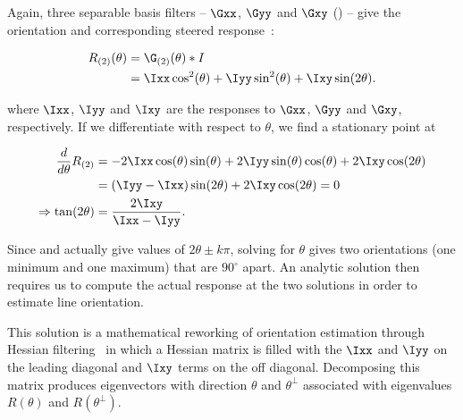 Again, three separable basis filters -- $\Gxx$, $\Gyy$ and $\Gxy$ () -- give the orientation and corresponding steered response~\cite{Freeman_Adelson_TPAMI91,Koenderink_vanDoorn_TPAMI92,Karssemeijer_teBrake_TMI96}:

\begin{align}
R_{(2)}(\theta)
	&= 	\G_{(2)}(\theta) \ast I \\
	&=	\Ixx\cos^2(\theta) + \Iyy\sin^2(\theta) + \Ixy\sin(2\theta).
\label{e:R2}
\end{align}

\noindent where $\Ixx$, $\Iyy$ and $\Ixy$ are the responses to $\Gxx$, $\Gyy$ and $\Gxy$, respectively. If we differentiate with respect to $\theta$, we find a stationary point at

\begin{align}
\frac{d}{d\theta}R_{(2)}
	&= 	-2\Ixx\cos(\theta)\sin(\theta) + 2\Iyy\sin(\theta)\cos(\theta) + 2\Ixy\cos(2\theta) \\
	&= 	(\Iyy-\Ixx)\sin(2\theta) + 2\Ixy\cos(2\theta) = 0 \\
\Rightarrow \tan(2\theta)
	&= 	\frac{2\Ixy}{\Ixx-\Iyy}.
\label{e:t2}
\end{align}

Since  and  actually give values of $2\theta \pm k\pi$, solving for $\theta$ gives two orientations (one minimum and one maximum) that are $90^\circ$ apart. An analytic solution then requires us to compute the actual response at the two solutions in order to estimate line orientation. 

This solution is a mathematical reworking of orientation estimation through Hessian filtering~\cite{Frangi_MICCAI98,Sato_MIA98} in which a Hessian matrix is filled with the $\Ixx$ and $\Iyy$ on the leading diagonal and $\Ixy$ terms on the off diagonal. Decomposing this matrix produces eigenvectors with direction $\theta$ and $\theta^{\perp}$ associated with eigenvalues $R(\theta)$ and $R(\theta^{\perp})$.